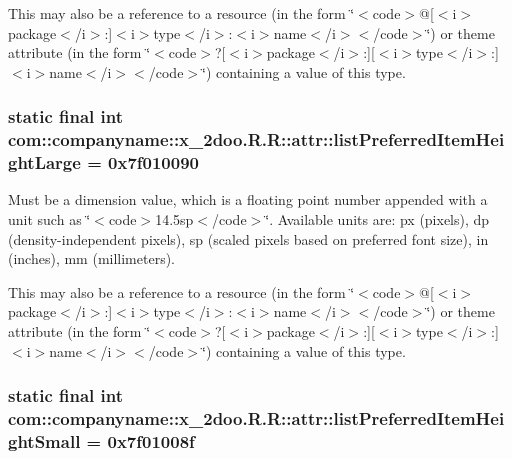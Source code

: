 This may also be a reference to a resource (in the form \char`\"{}$<$code$>$@\mbox{[}$<$i$>$package$<$/i$>$:\mbox{]}$<$i$>$type$<$/i$>$:$<$i$>$name$<$/i$>$$<$/code$>$\char`\"{}) or theme attribute (in the form \char`\"{}$<$code$>$?\mbox{[}$<$i$>$package$<$/i$>$:\mbox{]}\mbox{[}$<$i$>$type$<$/i$>$:\mbox{]}$<$i$>$name$<$/i$>$$<$/code$>$\char`\"{}) containing a value of this type. \hypertarget{classcom_1_1companyname_1_1x__2doo_1_1_r_1_1attr_531b566180a29eb3bd6ef33c78c86d65}{
\subsubsection[{listPreferredItemHeightLarge}]{\setlength{\rightskip}{0pt plus 5cm}static final int com::companyname::x\_\-2doo.R.R::attr::listPreferredItemHeightLarge = 0x7f010090}}
\label{classcom_1_1companyname_1_1x__2doo_1_1_r_1_1attr_531b566180a29eb3bd6ef33c78c86d65}


Must be a dimension value, which is a floating point number appended with a unit such as \char`\"{}$<$code$>$14.5sp$<$/code$>$\char`\"{}. Available units are: px (pixels), dp (density-independent pixels), sp (scaled pixels based on preferred font size), in (inches), mm (millimeters). 

This may also be a reference to a resource (in the form \char`\"{}$<$code$>$@\mbox{[}$<$i$>$package$<$/i$>$:\mbox{]}$<$i$>$type$<$/i$>$:$<$i$>$name$<$/i$>$$<$/code$>$\char`\"{}) or theme attribute (in the form \char`\"{}$<$code$>$?\mbox{[}$<$i$>$package$<$/i$>$:\mbox{]}\mbox{[}$<$i$>$type$<$/i$>$:\mbox{]}$<$i$>$name$<$/i$>$$<$/code$>$\char`\"{}) containing a value of this type. \hypertarget{classcom_1_1companyname_1_1x__2doo_1_1_r_1_1attr_9fe0dfb3cf4a868c1cb451ec9e3c372f}{
\subsubsection[{listPreferredItemHeightSmall}]{\setlength{\rightskip}{0pt plus 5cm}static final int com::companyname::x\_\-2doo.R.R::attr::listPreferredItemHeightSmall = 0x7f01008f}}
\label{classcom_1_1companyname_1_1x__2doo_1_1_r_1_1attr_9fe0dfb3cf4a868c1cb451ec9e3c372f}


